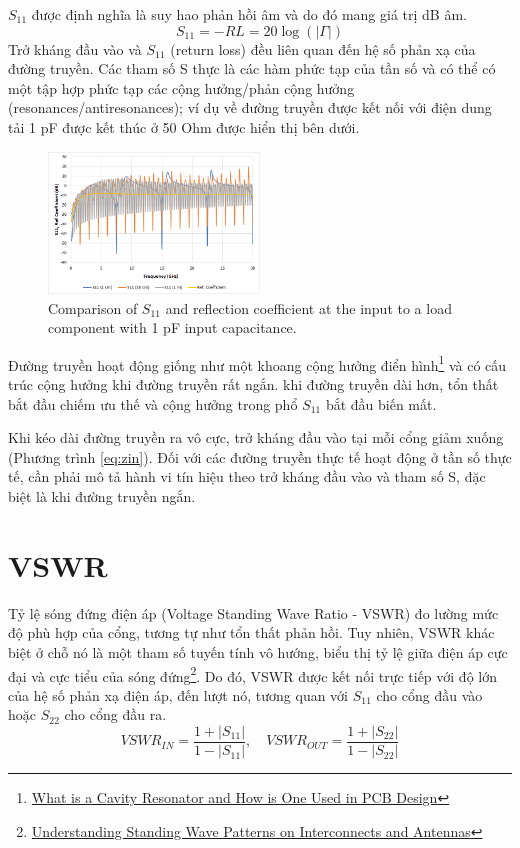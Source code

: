         $S_{11}$ được định nghĩa là suy hao phản hồi âm và do đó mang giá trị dB âm.
        $$S_{11} = -RL = 20\log\left(\left|\Gamma\right|\right)$$
        Trở kháng đầu vào và $S_{11}$ (return loss) đều liên quan đến hệ số phản xạ của đường truyền. Các tham số S thực là các hàm phức tạp của tần số và có thể có một tập hợp phức tạp các cộng hưởng/phản cộng hưởng (resonances/antiresonances); ví dụ về đường truyền được kết nối với điện dung tải 1 pF được kết thúc ở 50 Ohm được hiển thị bên dưới.\par
        \begin{figure}[h]
            \centering
            \includegraphics[width=0.5\textwidth]{figures/1pf_input.png}
            \caption{Comparison of $S_{11}$ and reflection coefficient at the input to a load component with 1 pF input capacitance.}
        \end{figure}

        Đường truyền hoạt động giống như một khoang cộng hưởng điển hình\footnote{\href{https://resources.pcb.cadence.com/blog/2019-what-is-a-cavity-resonator-and-how-is-one-used-in-pcb-design}{\color{blue}What is a Cavity Resonator and How is One Used in PCB Design}} và có cấu trúc cộng hưởng khi đường truyền rất ngắn. khi đường truyền dài hơn, tổn thất bắt đầu chiếm ưu thế và cộng hưởng trong phổ $S_{11}$ bắt đầu biến mất.\cite{cadence2021transmission}\par
        Khi kéo dài đường truyền ra vô cực, trở kháng đầu vào tại mỗi cổng giảm xuống (Phương trình \ref{eq:zin}). Đối với các đường truyền thực tế hoạt động ở tần số thực tế, cần phải mô tả hành vi tín hiệu theo trở kháng đầu vào và tham số S, đặc biệt là khi đường truyền ngắn.\cite{cadence2021transmission}\par

    \section{VSWR}
        Tỷ lệ sóng đứng điện áp (Voltage Standing Wave Ratio - VSWR) đo lường mức độ phù hợp của cổng, 
        tương tự như tổn thất phản hồi. Tuy nhiên, VSWR khác biệt ở chỗ nó là một tham số tuyến tính vô hướng, 
        biểu thị tỷ lệ giữa điện áp cực đại và cực tiểu của sóng đứng\footnote{\href{https://resources.pcb.cadence.com/blog/2022-understanding-standing-wave-patterns-on-interconnects-and-antennas}{\color{blue}Understanding Standing Wave Patterns on Interconnects and Antennas}}. 
        Do đó, VSWR được kết nối trực tiếp với độ lớn của hệ số phản xạ điện áp, 
        đến lượt nó, tương quan với $S_{11}$ cho cổng đầu vào hoặc $S_{22}$ cho cổng đầu ra.
        \begin{equation}
            {VSWR}_{IN} = \frac{1 + |S_{11}|}{1 - |S_{11}|}, \quad {VSWR}_{OUT} = \frac{1 + |S_{22}|}{1 - |S_{22}|}
        \end{equation}